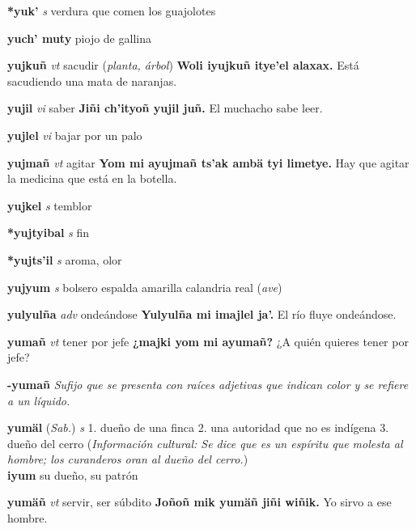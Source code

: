 \documentclass[10pt]{scrbook}
\newcommand{\entry}[1]{\textbf{#1}}
\newcommand{\onedefinition}[1]{#1.}
\newcommand{\nontranslationdef}[1]{\textit{#1}}
\newcommand{\partofspeech}[1]{\textit{#1}}
\newcommand{\spanishtranslation}[1]{#1}
\newcommand{\clarification}[1]{(\textit{#1})}
\newcommand{\cholexample}[1]{\textbf{#1}}
\newcommand{\exampletranslation}[1]{#1}
\newcommand{\relevantdialect}[1]{(\textit{#1})}
\newcommand{\culturalinformation}[1]{(\textit{#1})}
\newcommand{\secondaryentry}[1]{\\\textbf{#1}}
\newcommand{\secondtranslation}[1]{#1}
\begin{document}
\begin{multicols}{2}
\entry{*yuk'}
\partofspeech{s}
\spanishtranslation{verdura que comen los guajolotes}

\entry{yuch' muty}
\spanishtranslation{piojo de gallina}

\entry{yujkuñ}
\partofspeech{vt}
\spanishtranslation{sacudir}
\clarification{planta, árbol}
\cholexample{Woli iyujkuñ itye'el alaxax.}
\exampletranslation{Está sacudiendo una mata de naranjas.}

\entry{yujil}
\partofspeech{vi}
\spanishtranslation{saber}
\cholexample{Jiñi ch'ityoñ yujil juñ.}
\exampletranslation{El muchacho sabe leer.}

\entry{yujlel}
\partofspeech{vi}
\spanishtranslation{bajar por un palo}

\entry{yujmañ}
\partofspeech{vt}
\spanishtranslation{agitar}
\cholexample{Yom mi ayujmañ ts'ak ambä tyi limetye.}
\exampletranslation{Hay que agitar la medicina que está en la botella.}

\entry{yujkel}
\partofspeech{s}
\spanishtranslation{temblor}

\entry{*yujtyibal}
\partofspeech{s}
\spanishtranslation{fin}

\entry{*yujts'il}
\partofspeech{s}
\spanishtranslation{aroma, olor}

\entry{yujyum}
\partofspeech{s}
\spanishtranslation{bolsero espalda amarilla}
\spanishtranslation{calandria real}
\clarification{ave}

\entry{yulyulña}
\partofspeech{adv}
\spanishtranslation{ondeándose}
\cholexample{Yulyulña mi imajlel ja'.}
\exampletranslation{El río fluye ondeándose.}

\entry{yumañ}
\partofspeech{vt}
\spanishtranslation{tener por jefe}
\cholexample{¿majki yom mi ayumañ?}
\exampletranslation{¿A quién quieres tener por jefe?}

\entry{-yumañ}
\nontranslationdef{Sufijo que se presenta con raíces adjetivas que indican color y se refiere a un líquido.}

\entry{yumäl}
\relevantdialect{Sab.}
\partofspeech{s}
\onedefinition{1}
\spanishtranslation{dueño de una finca}
\onedefinition{2}
\spanishtranslation{una autoridad que no es indígena}
\onedefinition{3}
\spanishtranslation{dueño del cerro}
\culturalinformation{Información cultural: Se dice que es un espíritu que molesta al hombre; los curanderos oran al dueño del cerro.}
\secondaryentry{iyum}
\secondtranslation{su dueño, su patrón}

\entry{yumäñ}
\partofspeech{vt}
\spanishtranslation{servir, ser súbdito}
\cholexample{Joñoñ mik yumäñ jiñi wiñik.}
\exampletranslation{Yo sirvo a ese hombre.}


\end{multicols}
\end{document}
